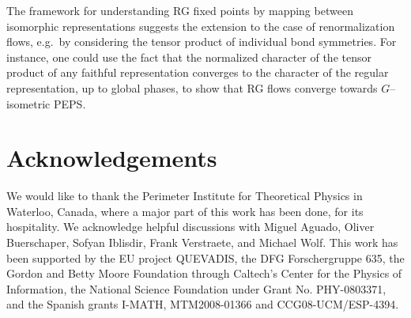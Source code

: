 \documentclass{article}
\theoremstyle{plain}
\theoremstyle{definition}
\numberwithin{equation}{section}  %
\begin{document}
The framework for understanding RG fixed points by mapping between
isomorphic representations suggests the extension to the case of
renormalization flows, e.g.\ by considering the tensor product of
individual bond symmetries.
For instance, one could use the fact that the
normalized character of the tensor product of any faithful representation
converges to the character of the regular representation, up to global
phases, to show that RG flows converge towards $G$--isometric PEPS.






\section{Acknowledgements}

We would like to thank the Perimeter Institute for Theoretical Physics in
Waterloo, Canada, where a major part of this work has been done, for its
hospitality.  We acknowledge helpful discussions with Miguel Aguado,
Oliver Buerschaper, Sofyan Iblisdir, Frank Verstraete, and Michael Wolf.
This work has been supported by the EU project QUEVADIS, the DFG
Forschergruppe 635, the Gordon and Betty Moore Foundation through
Caltech's Center for the Physics of Information, the National Science
Foundation under Grant No. PHY-0803371, and the Spanish grants I-MATH,
MTM2008-01366 and CCG08-UCM/ESP-4394.
\end{document}
